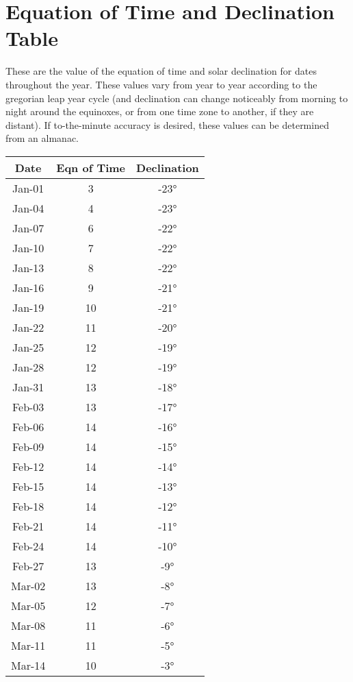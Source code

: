 \section{Equation of Time and Declination Table}

These are the value of the equation of time and solar declination for dates throughout the year. These values vary from year to year according to the gregorian leap year cycle (and declination can change noticeably from morning to night around the equinoxes, or from one time zone to another, if they are distant). If to-the-minute accuracy is desired, these values can be determined from an almanac.

\begin{footnotesize}
	\begin{minipage}{0.33\textwidth}
\begin{tabular}[t]{c | c | c }
	Date&Eqn of Time&Declination\\\hline
Jan-01 & 3 & -23°\\\hline
Jan-04 & 4 & -23°\\\hline
Jan-07 & 6 & -22°\\\hline
Jan-10 & 7 & -22°\\\hline
Jan-13 & 8 & -22°\\\hline
Jan-16 & 9 & -21°\\\hline
Jan-19 & 10 & -21°\\\hline
Jan-22 & 11 & -20°\\\hline
Jan-25 & 12 & -19°\\\hline
Jan-28 & 12 & -19°\\\hline
Jan-31 & 13 & -18°\\\hline
Feb-03 & 13 & -17°\\\hline
Feb-06 & 14 & -16°\\\hline
Feb-09 & 14 & -15°\\\hline
Feb-12 & 14 & -14°\\\hline
Feb-15 & 14 & -13°\\\hline
Feb-18 & 14 & -12°\\\hline
Feb-21 & 14 & -11°\\\hline
Feb-24 & 14 & -10°\\\hline
Feb-27 & 13 & -9°\\\hline
Mar-02 & 13 & -8°\\\hline
Mar-05 & 12 & -7°\\\hline
Mar-08 & 11 & -6°\\\hline
Mar-11 & 11 & -5°\\\hline
Mar-14 & 10 & -3°\\\hline

\end{tabular}
\end{minipage}
\end{footnotesize}
